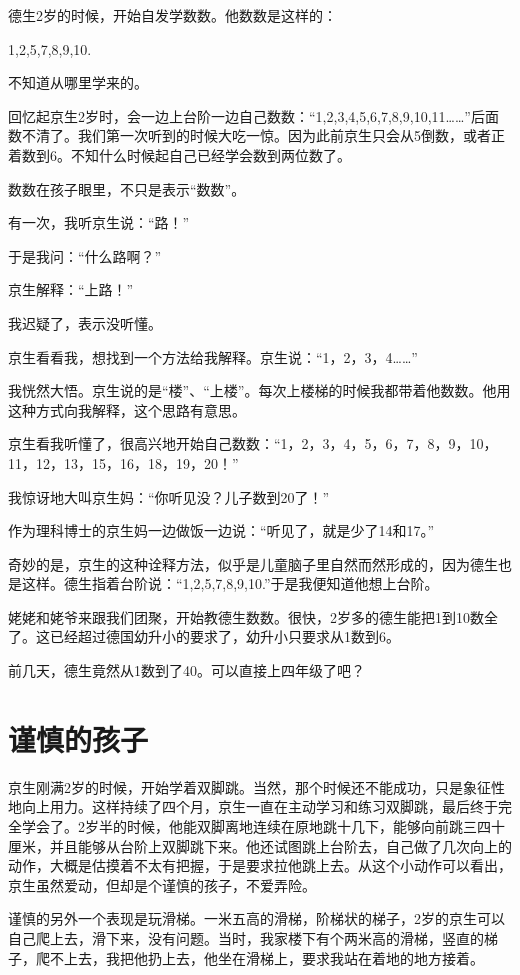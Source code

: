 \documentclass[twoside,openright,headings=optiontohead]{ctexbook} %
\begin{document}
{德生2岁的时候，开始自发学数数。他数数是这样的：

1,2,5,7,8,9,10.

不知道从哪里学来的。

回忆起京生2岁时，会一边上台阶一边自己数数：``1,2,3,4,5,6,7,8,9,10,11\ldots{}\ldots{}''后面数不清了。我们第一次听到的时候大吃一惊。因为此前京生只会从5倒数，或者正着数到6。不知什么时候起自己已经学会数到两位数了。

数数在孩子眼里，不只是表示``数数''。

有一次，我听京生说：``路！''

于是我问：``什么路啊？''

京生解释：``上路！''

我迟疑了，表示没听懂。

京生看看我，想找到一个方法给我解释。京生说：``1，2，3，4\ldots{}\ldots{}''

我恍然大悟。京生说的是``楼''、``上楼''。每次上楼梯的时候我都带着他数数。他用这种方式向我解释，这个思路有意思。

京生看我听懂了，很高兴地开始自己数数：``1，2，3，4，5，6，7，8，9，10，11，12，13，15，16，18，19，20！''

我惊讶地大叫京生妈：``你听见没？儿子数到20了！''

作为理科博士的京生妈一边做饭一边说：``听见了，就是少了14和17。''

奇妙的是，京生的这种诠释方法，似乎是儿童脑子里自然而然形成的，因为德生也是这样。德生指着台阶说：``1,2,5,7,8,9,10.''于是我便知道他想上台阶。

姥姥和姥爷来跟我们团聚，开始教德生数数。很快，2岁多的德生能把1到10数全了。这已经超过德国幼升小的要求了，幼升小只要求从1数到6。

前几天，德生竟然从1数到了40。可以直接上四年级了吧？

\chapter*{谨慎的孩子}\label{careful-boys}

京生刚满2岁的时候，开始学着双脚跳。当然，那个时候还不能成功，只是象征性地向上用力。这样持续了四个月，京生一直在主动学习和练习双脚跳，最后终于完全学会了。2岁半的时候，他能双脚离地连续在原地跳十几下，能够向前跳三四十厘米，并且能够从台阶上双脚跳下来。他还试图跳上台阶去，自己做了几次向上的动作，大概是估摸着不太有把握，于是要求拉他跳上去。从这个小动作可以看出，京生虽然爱动，但却是个谨慎的孩子，不爱弄险。

谨慎的另外一个表现是玩滑梯。一米五高的滑梯，阶梯状的梯子，2岁的京生可以自己爬上去，滑下来，没有问题。当时，我家楼下有个两米高的滑梯，竖直的梯子，爬不上去，我把他扔上去，他坐在滑梯上，要求我站在着地的地方接着。

}
\end{document}
